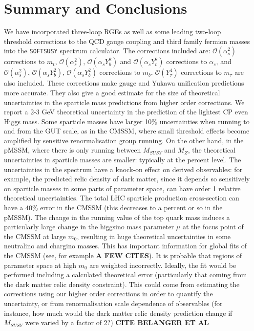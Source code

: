 \documentclass[final,3p,times,pdflatex]{elsarticle}
\begin{document}
\section{Summary and Conclusions}
 We have incorporated three-loop RGEs as well as some leading two-loop
 threshold corrections to the QCD gauge coupling and third family fermion
 masses into the {\tt SOFTSUSY} spectrum calculator. The corrections included
 are: $\mathcal O(\alpha_s^2)$ corrections to $m_t$, $\mathcal O(\alpha_s^2)$,
 $\mathcal O(\alpha_s Y_b^2)$ and
 $\mathcal O(\alpha_s 
 Y_t^2)$ corrections to $\alpha_s$, and $\mathcal O(\alpha_s^2)$, 
 $\mathcal O(\alpha_s Y_b^2)$, $\mathcal O(\alpha_s
 Y_b^2)$ corrections to $m_b$. $\mathcal O(Y_\tau^4)$
 corrections to $m_\tau$ are also included. These corrections make gauge and
 Yukawa unification  predictions more accurate. They also give a good estimate
 for the size of theoretical uncertainties in the sparticle mass predictions
 from higher order corrections. We report a 2-3 GeV theoretical uncertainty in
 the prediction  of 
 the lightest CP even Higgs mass. Some sparticle masses have larger 10$\%$
 uncertainties when running to and from the GUT scale, as in the CMSSM, where
 small threshold effects become amplified by sensitive renormalisation group
 running. On the other hand, in the pMSSM, where there is only running between
 $M_{SUSY}$ and $M_Z$, the theoretical uncertainties in sparticle masses are
 smaller: typically at the percent level. The uncertainties in the spectrum
 have a knock-on effect on derived observables: for example, the predicted
 relic density of dark matter, since it depends so sensitively on sparticle
 masses in some parts of parameter space, can have order 1 relative theoretical
 uncertainties. The total LHC sparticle production cross-section can have a
 $40\%$ error in the CMSSM (this decreases to a percent or so in the pMSSM).
 The change in the running
 value of the top quark mass induces a particularly large change in the
 higgsino mass parameter $\mu$ at the focus point of the CMSSM at large $m_0$,
 resulting in 
 huge theoretical uncertainties in some neutralino and chargino masses. 
 This has important information for global fits of the CMSSM (see, for example
{\bf A FEW CITES}). It is probable that regions of parameter space at high
$m_0$ are weighted 
 incorrectly. Ideally, the fit would be performed including a calculated
 theoretical error (particularly that coming from the dark matter relic
 density constraint). This could come from estimating the corrections using 
 our higher order corrections in order to quantify the uncertainty, or from
 renormalisation scale dependence of observables (for instance, how much would
 the dark matter relic density prediction change if $M_{SUSY}$ were varied by
 a factor of 2?) {\bf CITE BELANGER ET AL}
\end{document}
